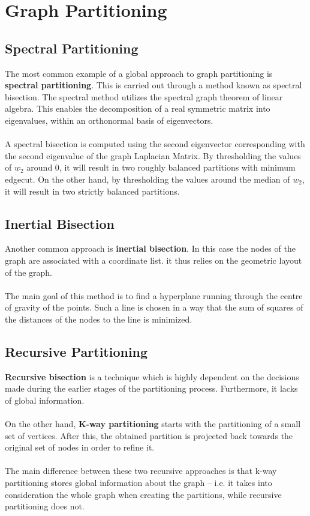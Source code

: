 \documentclass{article}
\begin{document}
\section{Graph Partitioning}
\subsection{Spectral Partitioning}
The most common example of a global approach to graph partitioning is \textbf{spectral partitioning}. This is carried out through a method known as spectral bisection. The spectral method utilizes the spectral graph theorem of linear algebra. This enables the decomposition of a real symmetric matrix into eigenvalues, within an orthonormal basis of eigenvectors. \\ \\
A spectral bisection is computed using the second eigenvector corresponding with the second eigenvalue of the graph Laplacian Matrix. By thresholding the values of $w_2$ around 0, it will result in two roughly balanced partitions with minimum edgecut. On the other hand, by thresholding the values around the median of $w_2$, it will result in two strictly balanced partitions.

\subsection{Inertial Bisection}
Another common approach is \textbf{inertial bisection}. In this case the nodes of the graph are associated with a coordinate list. it thus relies on the geometric layout of the graph. \\ \\
The main goal of this method is to find a hyperplane running through the centre of gravity of the points. Such a line is chosen in a way that the sum of squares of the distances of the nodes to the line is minimized.

\subsection{Recursive Partitioning}
\textbf{Recursive bisection} is a technique which is highly dependent on the decisions made during the earlier stages of the partitioning process. Furthermore, it lacks of global information. \\ \\
On the other hand, \textbf{K-way partitioning} starts with the partitioning of a small set of vertices. After this, the obtained partition is projected back towards the original set of nodes in order to refine it. \\ \\
The main difference between these two recursive approaches is that k-way partitioning stores global information about the graph -- i.e. it takes into consideration the whole graph when creating the partitions, while recursive partitioning does not.
\end{document}
